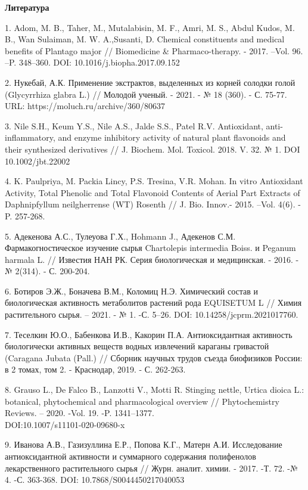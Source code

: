 \begin{center}
{\bfseries Литература}
\end{center}

\begin{references}
1. Adom, M. B., Taher, M., Mutalabisin, M. F., Amri, M. S., Abdul Kudos,
M. B., Wan Sulaiman, M. W. A.,Susanti, D. Chemical constituents and
medical benefits of Plantago major // Biomedicine \& Pharmaco-therapy.
- 2017. --Vol. 96. --P. 348--360. DOI: 10.1016/j.biopha.2017.09.152

2. Нукебай, А.К. Применение экстрактов, выделенных из корней солодки
голой (Glycyrrhiza glabra L.) // Молодой ученый. - 2021. - № 18 (360).
- С. 75-77. URL: https://moluch.ru/archive/360/80637

3. Nile S.H., Keum Y.S., Nile A.S., Jalde S.S., Patel R.V. Antioxidant,
anti-inflammatory, and enzyme inhibitory activity of natural plant
flavonoids and their synthesized derivatives // J. Biochem. Mol.
Toxicol. 2018. V. 32. № 1. DOI 10.1002/jbt.22002

4. K. Paulpriya, M. Packia Lincy, P.S. Tresina, V.R. Mohan. In vitro
Antioxidant Activity, Total Phenolic and Total Flavonoid Contents of
Aerial Part Extracts of Daphnipfyllum neilgherrense (WT) Rosenth // J.
Bio. Innov.- 2015. --Vol. 4(6). - P. 257-268.

5. Адекенова А.С., Тулеуова Г.Х., Hohmann J., Адекенов С.М.
Фармакогностическое изучение сырья Chartolepis intermedia Boiss. и
Peganum harmala L. // Известия НАН РК. Серия биологическая и
медицинская. - 2016. - № 2(314). - С. 200-204.

6. Ботиров Э.Ж., Боначева В.М., Коломиц Н.Э. Химический состав и
биологическая активность метаболитов растений рода EQUISETUM L //
Химия растительного сырья. -- 2021. - № 1. -С. 5--26. DOI:
10.14258/jcprm.2021017760.

7. Теселкин Ю.О., Бабенкова И.В., Какорин П.А. Антиоксидантная активность
биологически активных веществ водных извлечений караганы гривастой
(Caragana Jubata (Pall.) // Сборник научных трудов съезда биофизиков
России: в 2 томах, том 2. - Краснодар, 2019. - С. 262-263.

8. Grauso L., De Falco B., Lanzotti V., Motti R. Stinging nettle, Urtica
dioica L.: botanical, phytochemical and pharmacological overview //
Phytochemistry Reviews. -- 2020. -Vol. 19. -P. 1341--1377.
\\DOI:10.1007/s11101-020-09680-x

9. Иванова А.В., Газизуллина Е.Р., Попова К.Г., Матерн А.И. Исследование
антиоксидантной активности и суммарного содержания полифенолов
лекарственного растительного сырья // Журн. аналит. химии. - 2017. -Т.
72. -№ 4. -С. 363-368. DOI: 10.7868/S0044450217040053


\end{references}

